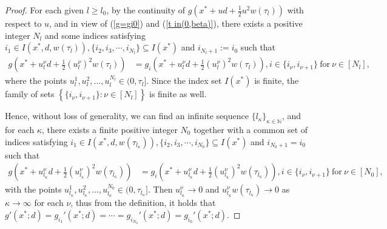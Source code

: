 \documentclass[11pt]{article}
\theoremstyle{definition}
\theoremstyle{remark}
\numberwithin{equation}{section}
\begin{document}
\begin{proof}
For each given $l\ge l_0$, by the continuity of $g\left(x^*+u d+\frac{1}{2}u^2 w(\tau_l)\right)$  with respect to $u$,  and in view of (\ref{g=gi0}) and (\ref{t in(0,beta)}),
  there exists a positive integer $N_l$ and some   indices satisfying
  $i_1\in I(x^*,d,w(\tau_{l})), \{i_2,i_3,\cdots,i_{N_l}\} \subseteq I(x^*)$  and $i_{N_l+1}:=i_0$
   such that
\begin{align*}
    g\left(x^*+u_{l}^{\nu} d+\frac{1}{2}(u_{l}^{\nu})^2 w(\tau_{l})\right)
   &=g_{i}\left(x^*+u_{l}^{\nu} d+\frac{1}{2}(u_{l}^{\nu})^2 w(\tau_{l})\right), i\in\{i_{\nu},i_{\nu+1}\}  ~\text{for}~ \nu\in[N_l],
   \end{align*}
   where the points  $u_{l}^1,u_{l}^2,\ldots,u_{l}^{N_l} \in (0, \tau_{l}]$.
Since the index set $I(x^*)$ is finite, the family of sets $\left\{\{i_{\nu},i_{\nu+1}\}:\nu\in[N_l]\right\}$   is finite as well.

Hence, without loss of generality,
we can find an infinite sequence $\{l_{\kappa}\}_{\kappa\in \mathbb{N}}$, and for each $\kappa$, there exists a finite   positive integer $N_0$ together with
 a common set of indices satisfying
   $i_1\in I(x^*,d,w(\tau_{l_{\kappa}})), \{i_2,i_3,\cdots,i_{N_0}\} \subseteq I(x^*)  $  and $i_{N_0+1}=i_0$
   such that
\begin{align*}
g\left(x^*+u_{l_{\kappa}}^{\nu} d+\frac{1}{2}(u_{l_{\kappa}}^{\nu})^2 w(\tau_{l_{\kappa}})\right)
   &=g_{i}\left(x^*+u_{l_{\kappa}}^{\nu} d+\frac{1}{2}(u_{l_{\kappa}}^{\nu})^2 w(\tau_{l_{\kappa}})\right), i\in\{i_{\nu},i_{\nu+1}\} ~\text{for}~ \nu\in[N_0],
   \end{align*}
with the points  $u_{l_{\kappa}}^1,u_{l_{\kappa}}^2,\ldots,u_{l_{\kappa}}^{N_0} \in (0, \tau_{l_{\kappa}}]$.
Then $u_{l_{\kappa}}^{\nu}\to 0$ and $u_{l_{\kappa}}^{\nu} w(\tau_{l_{\kappa}})\to 0$ as $\kappa\to \infty$ for each $\nu$,
 thus from the definition,   it holds that $g'(x^*;d)=g_{i_1}'(x^*;d)=\cdots=g_{i_{N_0}}'(x^*;d)=g_{i_0}'(x^*;d)$.



\end{proof}
\end{document}
